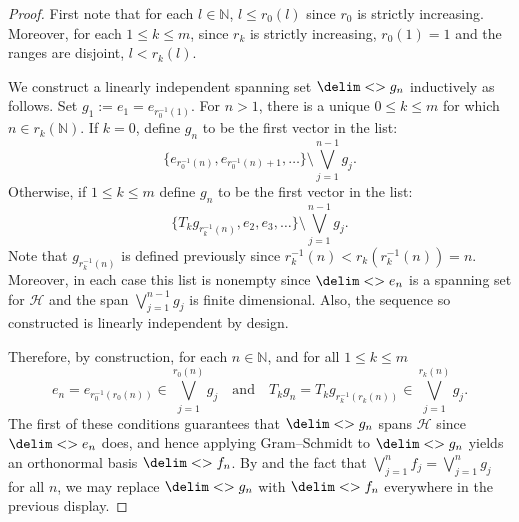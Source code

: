 \documentclass[10pt,reqno]{amsart}
\theoremstyle{remark}
\newcommand{\Hil}{\mathcal{H}}
\newcommand{\seq}{\delim<>}
\numberwithin{equation}{section}
\begin{document}
\begin{proof}
  First note that for each $l \in \mathbb{N}$, $l \le r_0(l)$ since $r_0$ is strictly increasing.
  Moreover, for each $1 \le k \le m$, since $r_k$ is strictly increasing, $r_0(1) = 1$ and the ranges are disjoint, $l < r_k(l)$.

  We construct a linearly independent spanning set $\seq{g_n}$ inductively as follows.
  Set $g_1 := e_1 = e_{r^{-1}_0(1)}$.
  For $n > 1$, there is a unique $0 \le k \le m$ for which $n \in r_k(\mathbb{N})$.
  If $k = 0$, define $g_n$ to be the first vector in the list:
  \begin{equation}
    \label{eq:r0-gn-def}
    \{ e_{r_0^{-1}(n)}, e_{r_0^{-1}(n) + 1}, \ldots \} \setminus \bigvee_{j=1}^{n-1} g_j.
  \end{equation}
  Otherwise, if $1 \le k \le m$ define $g_n$ to be the first vector in the list:
  \begin{equation}
    \label{eq:rk-gn-def}
    \{ T_k g_{r_k^{-1}(n)}, e_2, e_3, \ldots \} \setminus \bigvee_{j=1}^{n-1} g_j.
  \end{equation}
  Note that $g_{r_k^{-1}(n)}$ is defined previously since $r_k^{-1}(n) < r_k(r_k^{-1}(n)) = n$.
  Moreover, in each case this list is nonempty since $\seq{e_n}$ is a spanning set for $\Hil$ and the span $\bigvee_{j=1}^{n-1} g_j$ is finite dimensional.
  Also, the sequence so constructed is linearly independent by design.

  Therefore, by construction, for each $n \in \mathbb{N}$, and for all $1 \le k \le m$
  \begin{equation*}
    e_n = e_{r_0^{-1}(r_0(n))} \in \bigvee_{j=1}^{r_0(n)} g_j
    \quad\text{and}\quad
    T_k g_n = T_k g_{r_k^{-1}(r_k(n))} \in \bigvee_{j=1}^{r_k(n)} g_j.
  \end{equation*}
  The first of these conditions guarantees that $\seq{g_n}$ spans $\Hil$ since $\seq{e_n}$ does, and hence applying Gram--Schmidt to $\seq{g_n}$ yields an orthonormal basis $\seq{f_n}$.
  By  and the fact that $\bigvee_{j=1}^n f_j = \bigvee_{j=1}^n g_j$ for all $n$, we may replace $\seq{g_n}$ with $\seq{f_n}$ everywhere in the previous display.


\end{proof}
\end{document}
